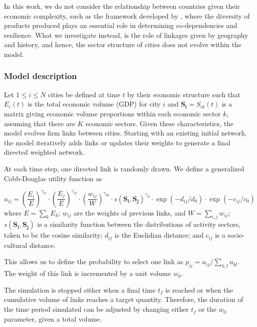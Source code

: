\documentclass[10pt,letterpaper]{article}
\begin{document}
In this work, we do not consider the relationship between countries given their economic complexity, such as the framework developed by  \cite{hidalgo2007product}, where the diversity of products produced plays an essential role in determining co-dependencies and resilience.
What we investigate instead, is the role of linkages given by geography and history, and hence, the sector structure of cities does not evolve within the model.


\subsubsection*{Model description}

Let $1 \leq i \leq N$ cities be defined at time $t$ by their economic structure such that $E_i(t)$ is the total economic volume (GDP) for city $i$ and $\mathbf{S_i} = S_{ik}(t)$ is a matrix giving economic volume proportions within each economic sector $k$, assuming that there are $K$ economic sectors. Given these characteristics, the model evolves firm links between cities. Starting with an existing initial network, the model iteratively adds links or updates their weights to generate a final directed weighted network.

At each time step, one directed link is randomly drawn. We define a generalized Cobb-Douglas utility function \cite{vilcu2011geometric} as 

\begin{equation}
u_{ij} = \left(\frac{E_{i}}{E}\right)^{\gamma_O} \cdot \left(\frac{E_{j}}{E}\right)^{\gamma_D} \cdot \left(\frac{w_{ij}}{W}\right)^{\gamma_W} \cdot s\left(\mathbf{S_{i}},\mathbf{S_{j}}\right)^{\gamma_S} \cdot \exp \left(- d_{ij} / d_0\right) \cdot \exp \left(- c_{ij} / c_0\right)
\end{equation}
where $E  =  \sum_k E_k$; $w_{ij}$ are the weights of previous links, and $W  = \sum_{i,j} w_{ij}$; $s(\mathbf{S_{i}},\mathbf{S_{j}})$ is a similarity function between the distributions of activity sectors, taken to be the cosine similarity; $d_{ij}$ is the Euclidian distance; and $c_{ij}$ is a socio-cultural distance.

This allows us to define the probability to select one link as $p_{ij} = u_{ij} / \sum_{k,l} u_{kl}$. The weight of this link is incremented by a unit volume $w_0$.

The simulation is stopped either when a final time $t_f$ is reached or when the cumulative volume of links reaches a target quantity. Therefore, the duration of the time period simulated can be adjusted by changing either $t_f$ or the $w_0$ parameter, given a total volume. 
\end{document}
